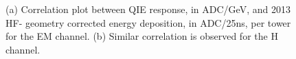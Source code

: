 \begin{figure}[htb]
   \begin{center}
      \caption{(a) Correlation plot between QIE response, in ADC/GeV, and 2013 HF-
               geometry corrected energy deposition, in ADC/25\unit{ns}, per tower
               for the EM channel.
               (b) Similar correlation is observed for the H channel.}
      \label{fig:QIE_Slope}
   \end{center}
\end{figure}

